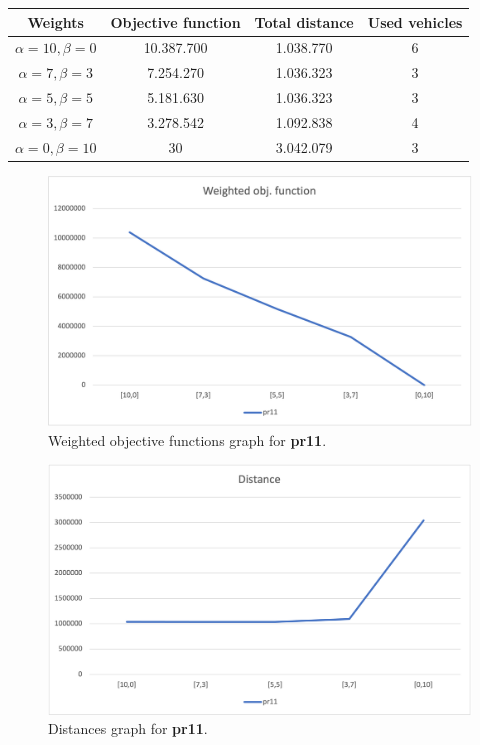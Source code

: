 {
\renewcommand{\arraystretch}{2}
\begin{longtable}[h]{| c | c | c | c |}
    \hline
    \textbf{Weights} & \textbf{Objective function} & \textbf{Total distance} & \textbf{Used vehicles} \\
    \hline
    \endhead
    $\alpha = 10, \beta = 0$ & 10.387.700 & 1.038.770 & 6 \\
    \hline
    $\alpha = 7, \beta = 3$  &  7.254.270 & 1.036.323 & 3 \\
    \hline
    $\alpha = 5, \beta = 5$  &  5.181.630 & 1.036.323 & 3 \\
    \hline
    $\alpha = 3, \beta = 7$  &  3.278.542 & 1.092.838 & 4 \\
    \hline
    $\alpha = 0, \beta = 10$ &         30 & 3.042.079 & 3 \\
    \hline
\end{longtable}
}
\begin{figure}[H]
    \centering
    \includegraphics[height=0.25\textheight]{../graphs/pr11-wobjf.png}
    \caption{Weighted objective functions graph for \textbf{pr11}.}
\end{figure}

\begin{figure}[H]
    \centering
    \includegraphics[height=0.25\textheight]{../graphs/pr11-distance.png}
    \caption{Distances graph for \textbf{pr11}.}
\end{figure}

